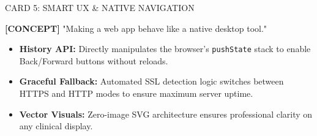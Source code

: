 \documentclass[12pt, a4paper]{article}
\begin{document}
\begin{presentercard}{CARD 5: SMART UX \& NATIVE NAVIGATION}
    \begin{minipage}{0.62\textwidth}
        \textbf{[CONCEPT]} "Making a web app behave like a native desktop tool."
        \begin{itemize}
            \item \textbf{History API:} Directly manipulates the browser's \texttt{pushState} stack to enable Back/Forward buttons without reloads.
            \item \textbf{Graceful Fallback:} Automated SSL detection logic switches between HTTPS and HTTP modes to ensure maximum server uptime.
            \item \textbf{Vector Visuals:} Zero-image SVG architecture ensures professional clarity on any clinical display.
        \end{itemize}
    \end{minipage}
    \begin{minipage}{0.35\textwidth}
        \centering
    \end{minipage}
\end{presentercard}
\end{document}
